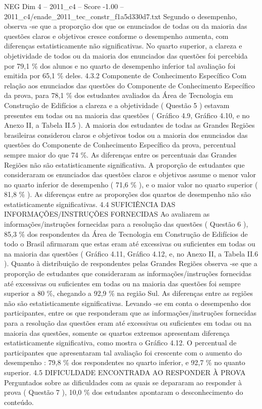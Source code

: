 \begin{textsample}{NEG Dim 4 – 2011\_c4 – Score -1.00 – 2011\_c4/enade\_2011\_tec\_constr\_f1a5d330d7.txt}
Segundo o desempenho, observa -se que a proporção dos que os enunciados de todas ou da maioria das questões claros e objetivos cresce conforme o desempenho aumenta, com diferenças estatisticamente não significativas.
No quarto superior, a clareza e objetividade de todos ou da maioria dos enunciados das questões foi percebida por 79,1 \% dos alunos e no quarto de desempenho inferior tal avaliação foi emitida por 65,1 \% deles. 4.3.2 Componente de Conhecimento Específico Com relação aos enunciados das questões do Componente de Conhecimento Específico da prova, para 78,1 \% dos estudantes avaliados da Área de Tecnologia em Construção de Edifícios a clareza e a objetividade ( Questão 5 ) estavam presentes em todas ou na maioria das questões ( Gráfico 4.9, Gráfico 4.10, e no Anexo II, a Tabela II.5 ).
A maioria dos estudantes de todas as Grandes Regiões brasileiras considerou claros e objetivos todos ou a maioria dos enunciados das questões do Componente de Conhecimento Específico da prova, percentual sempre maior do que 74 \%.
As diferenças entre os percentuais das Grandes Regiões não são estatisticamente significativa.
A proporção de estudantes que consideraram os enunciados das questões claros e objetivos assume o menor valor no quarto inferior de desempenho ( 71,6 \% ), e o maior valor no quarto superior ( 81,8 \% ).
As diferenças entre as proporções dos quartos de desempenho não são estatisticamente significativas. 4.4 SUFICIÊNCIA DAS INFORMAÇÕES/INSTRUÇÕES FORNECIDAS Ao avaliarem as informações/instruções fornecidas para a resolução das questões ( Questão 6 ), 85,3 \% dos respondentes da Área de Tecnologia em Construção de Edifícios de todo o Brasil afirmaram que estas eram até excessivas ou suficientes em todas ou na maioria das questões ( Gráfico 4.11, Gráfico 4.12, e, no Anexo II, a Tabela II.6 ).
Quanto à distribuição de respondentes pelas Grandes Regiões observa -se que a proporção de estudantes que consideraram as informações/instruções fornecidas até excessivas ou suficientes em todas ou na maioria das questões foi sempre superior a 80 \%, chegando a 92,9 \% na região Sul.
As diferenças entre as regiões não são estatisticamente significativas.
Levando -se em conta o desempenho dos participantes, entre os que responderam que as informações/instruções fornecidas para a resolução das questões eram até excessivas ou suficientes em todas ou na maioria das questões, somente os quartos extremos apresentam diferença estatisticamente significativa, como mostra o Gráfico 4.12.
O percentual de participantes que apresentaram tal avaliação foi crescente com o aumento do desempenho : 79,8 \% dos respondentes no quarto inferior, e 92,7 \% no quanto superior. 4.5 DIFICULDADE ENCONTRADA AO RESPONDER À PROVA Perguntados sobre as dificuldades com as quais se depararam ao responder à prova ( Questão 7 ), 10,0 \% dos estudantes apontaram o desconhecimento do conteúdo.

\end{textsample}
